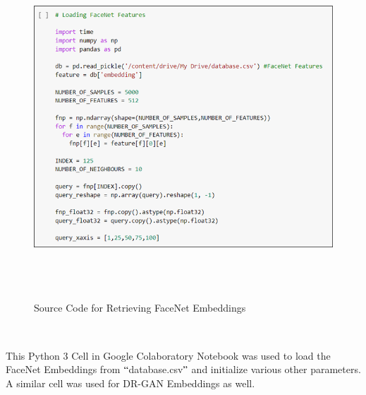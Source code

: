 \documentclass[12pt]{article}
\renewcommand{\_}{\kern-1.5pt\textunderscore\kern-1.5pt}
\begin{document}
\begin{Center}



\begin{figure}[H]
	\begin{Center}
		\includegraphics[width=6.27in,height=5.06in]{./media/image4.png}
		\caption{Source Code for Retrieving FaceNet Embeddings}
		\label{fig:Source_Code_for_Retrieving_FaceNet_Embeddings}
	\end{Center}
\end{figure}



\\

\end{Center}\par

\begin{justify}
This Python 3 Cell in Google Colaboratory Notebook was used to load the FaceNet Embeddings  \cite{schroff2015facenet}  from $``$database.csv$"$  and initialize various other parameters. A similar cell was used for DR-GAN Embeddings \cite{tran2017disentangled}  as well.
\end{justify}\par
\end{document}
